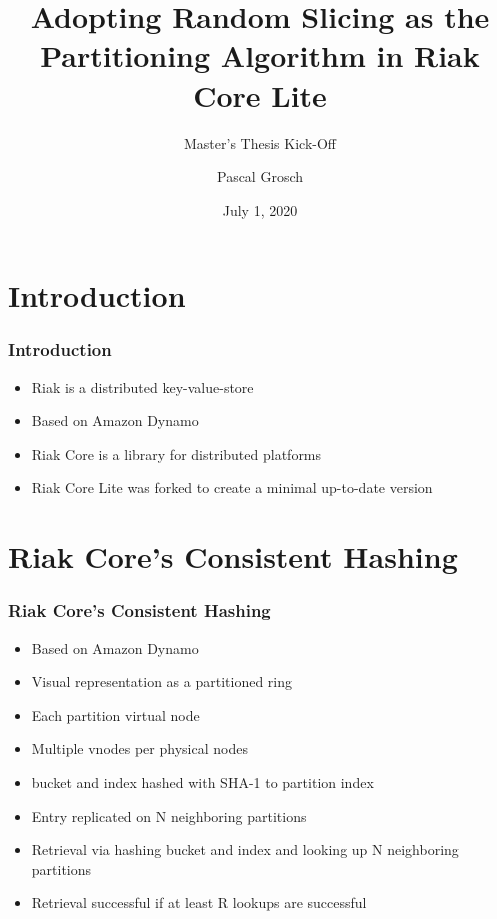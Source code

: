 \documentclass[aspectratio=169]{beamer}
\title[Master's Thesis Kick-Off]{Adopting Random Slicing as the Partitioning Algorithm in Riak Core Lite}
\subtitle{Master's Thesis Kick-Off}
\author{Pascal Grosch}
\institute{TU Kaiserslautern}
\date{July 1, 2020}
\begin{document}
\frame{\titlepage}
\section{Introduction}
\begin{frame}
\frametitle{Introduction}
\begin{itemize}
\item Riak is a distributed key-value-store
\item Based on Amazon Dynamo
\item Riak Core is a library for distributed platforms
\item Riak Core Lite was forked to create a minimal up-to-date version
\end{itemize}
\end{frame}

\section{Riak Core's Consistent Hashing}
\begin{frame}
\frametitle{Riak Core's Consistent Hashing}
\begin{itemize}
\item Based on Amazon Dynamo
\item Visual representation as a partitioned ring
\item Each partition virtual node
\item Multiple vnodes per physical nodes
\item bucket and index hashed with SHA-1 to partition index
\item Entry replicated on N neighboring partitions
\item Retrieval via hashing bucket and index and looking up N neighboring partitions
\item Retrieval successful if at least R lookups are successful
\end{itemize}
\end{frame}
\end{document}

